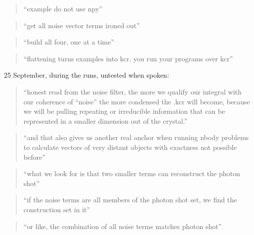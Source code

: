 \begin{quote}
“example do not use npy”

\end{quote}

\begin{quote}
“get all noise vector terms ironed out”

\end{quote}

\begin{quote}
“build all four, one at a time”

\end{quote}

\begin{quote}
“flattening turns examples into kcr. you run your programs over kcr”

\end{quote}

25 September, during the runs, untested when spoken:

\begin{quote}
“honest read from the noise filter, the more we qualify our integral with our coherence of “noise” the more condensed the .kcr will become, because we will be pulling repeating or irreducible information that can be represented in a smaller dimension out of the crystal.”

\end{quote}

\begin{quote}
“and that also gives us another real anchor when running nbody problems to calculate vectors of very distant objects with exactness not possible before”

\end{quote}

\begin{quote}
“what we look for is that two smaller terms can reconstruct the photon shot”

\end{quote}

\begin{quote}
“if the noise terms are all members of the photon shot set, we find the construction set in it”

\end{quote}

\begin{quote}
“or like, the combination of all noise terms matches photon shot”

\end{quote}


